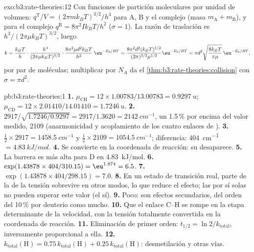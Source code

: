 \begin{solution}{exo:b3:rate-theories:12}
Con funciones de partición moleculares por unidad de volumen: $q^{\mathrm T}/V = (2\pi mk_BT)^{3/2}/h^3$ para
A, B y el complejo (masa $m_{\mathrm A} + m_{\mathrm B}$), y para el complejo $q^{\mathrm R} = 8\pi^2Ik_BT/h^2$
($\sigma = 1$). La razón de traslación es $h^3/(2\pi\mu k_BT)^{3/2}$, luego
\[
  k = \frac{k_BT}{h}\cdot\frac{h^3}{(2\pi\mu k_BT)^{3/2}}\cdot\frac{8\pi^2\mu d^2k_BT}{h^2}\,\eu^{-E_0/RT}
    = \frac{8\pi^2d^2(k_BT)^{1/2}}{(2\pi)^{3/2}\mu^{1/2}}\eu^{-E_0/RT}
    = \pi d^2\sqrt{\frac{8k_BT}{\pi\mu}}\,\eu^{-E_0/RT},
\]
por par de moléculas; multiplicar por $N_A$ da el \cref{thm:b3:rate-theories:collision}
con $\sigma = \pi d^2$.
\end{solution}

\begin{solution}{pb:b3:rate-theories:1}
\textbf{1.} $\mu_{\mathrm{CH}} = 12 \times 1.00783/13.00783 = \qty{0.9297}{u}$; $\mu_{\mathrm{CD}} = 12 \times 2.01410/14.01410 =
\qty{1.7246}{u}$.
\textbf{2.} $2917/\sqrt{1.7246/0.9297} = 2917/1.3620 = \qty{2142}{cm^{-1}}$, un 1.5\,\% por encima del
valor medido, 2109 (anarmonicidad y acoplamiento de los cuatro enlaces de ).
\textbf{3.} $\frac12 \times 2917 = \qty{1458.5}{cm^{-1}}$ y $\frac12 \times 2109 = \qty{1054.5}{cm^{-1}}$; diferencia:
\qty{404}{cm^{-1}} $= \qty{4.83}{kJ/mol}$.
\textbf{4.} Se convierte en la coordenada de reacción: su  desaparece.
\textbf{5.} La barrera es más alta para D en \qty{4.83}{kJ/mol}.
\textbf{6.} $\exp(1.43878 \times 404/310.15) = \eu^{1.874} = 6.5$.
\textbf{7.} $\exp(1.43878 \times 404/298.15) = 7.0$.
\textbf{8.} En un estado de transición real, parte de la  de la tensión
sobrevive en otros modos, lo que reduce el efecto; las  por sí solas
no pueden superar este valor (el  sí).
\textbf{9.} Poco: son efectos secundarios, del orden del 10\,\% por deuterio como
mucho.
\textbf{10.} Que el enlace C--H se rompe en la etapa determinante de la velocidad, con la
tensión totalmente convertida en la coordenada de reacción.
\textbf{11.} Eliminación de primer orden: $t_{1/2} = \ln2/k_{\mathrm{total}}$, inversamente proporcional a ella.
\textbf{12.} $k_{\mathrm{total}}(\mathrm H) = 0.75\,k_{\mathrm{total}}(\mathrm H) + 0.25\,k_{\mathrm{total}}(\mathrm H)$: desmetilación y otras vías.

\end{solution}
